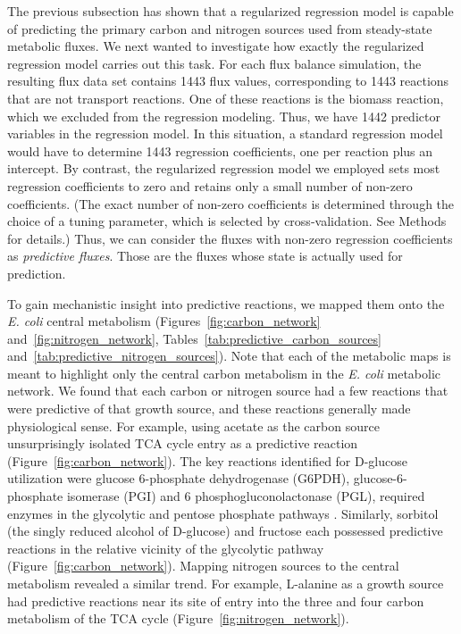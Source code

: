 \documentclass[12pt]{article}
\begin{document}
The previous subsection has shown that a regularized regression model is capable of predicting the primary carbon and nitrogen sources used from steady-state metabolic fluxes. We next wanted to investigate how exactly the regularized regression model carries out this task. For each flux balance simulation, the resulting flux data set contains 1443 flux values, corresponding to 1443 reactions that are not transport reactions. One of these reactions is the biomass reaction, which we excluded from the regression modeling. Thus, we have 1442 predictor variables in the regression model. In this situation, a standard regression model would have to determine 1443 regression coefficients, one per reaction plus an intercept. By contrast, the regularized regression model we employed sets most regression coefficients to zero and retains only a small number of non-zero coefficients. (The exact number of non-zero coefficients is determined through the choice of a tuning parameter, which is selected by cross-validation. See Methods for details.) Thus, we can consider the fluxes with non-zero regression coefficients as \emph{predictive fluxes}. Those are the fluxes whose state is actually used for prediction.

To gain mechanistic insight into predictive reactions, we mapped them onto the \emph{E. coli} central metabolism (Figures~\ref{fig:carbon_network} and~\ref{fig:nitrogen_network}, Tables~\ref{tab:predictive_carbon_sources} and~\ref{tab:predictive_nitrogen_sources}). Note that each of the metabolic maps is meant to highlight only the central carbon metabolism in the \emph{E. coli} metabolic network. We found that each carbon or nitrogen source had a few reactions that were predictive of that growth source, and these reactions generally made physiological sense. For example, using acetate as the carbon source unsurprisingly isolated TCA cycle entry as a predictive reaction (Figure~\ref{fig:carbon_network}). The key reactions identified for D-glucose utilization were glucose 6-phosphate dehydrogenase (G6PDH), glucose-6-phosphate isomerase (PGI) and 6 phosphogluconolactonase (PGL), required enzymes in the glycolytic and pentose phosphate pathways \cite{KuporFraenkel1972}. Similarly, sorbitol (the singly reduced alcohol of D-glucose) and fructose each possessed predictive reactions in the relative vicinity of the glycolytic pathway (Figure~\ref{fig:carbon_network}). Mapping nitrogen sources to the central metabolism revealed a similar trend. For example, L-alanine as a growth source had predictive reactions near its site of entry into the three and four carbon metabolism of the TCA cycle (Figure~\ref{fig:nitrogen_network}).
\end{document}
